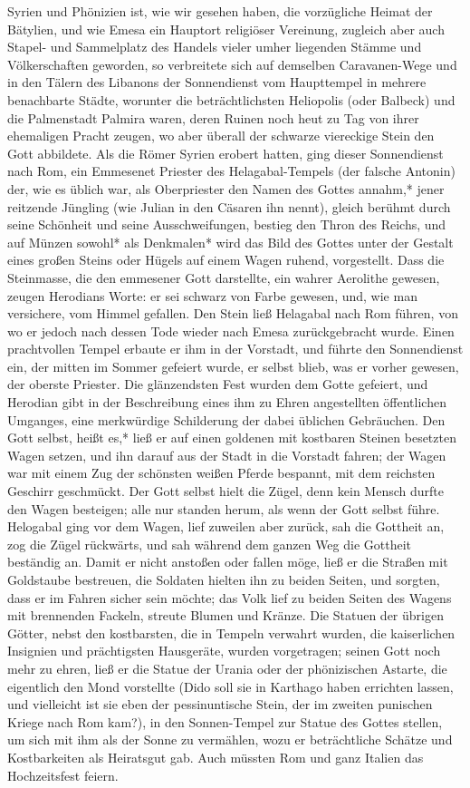 \documentclass[a4paper, 11pt, oneside, polutonikogreek, german]{article}
\begin{document}
Syrien und Phönizien ist, wie wir gesehen haben, die vorzügliche Heimat der Bätylien, und wie Emesa ein Hauptort religiöser Vereinung, zugleich aber auch Stapel- und Sammelplatz des Handels vieler umher liegenden Stämme und Völkerschaften geworden, so verbreitete sich auf demselben Caravanen-Wege und in den Tälern des Libanons der Sonnendienst vom Haupttempel in mehrere benachbarte Städte, worunter die beträchtlichsten Heliopolis (oder Balbeck) und die Palmenstadt Palmira waren, deren Ruinen noch heut zu Tag von ihrer ehemaligen Pracht zeugen, wo aber überall der schwarze viereckige Stein den Gott abbildete. Als die Römer Syrien erobert hatten, ging dieser Sonnendienst nach Rom, ein Emmesenet Priester des Helagabal-Tempels (der falsche Antonin) der, wie es üblich war, als Oberpriester den Namen des Gottes annahm,* jener reitzende Jüngling (wie Julian in den Cäsaren ihn nennt), gleich berühmt durch seine Schönheit und seine Ausschweifungen, bestieg den Thron des Reichs, und auf Münzen sowohl* als Denkmalen* wird das Bild des Gottes unter der Gestalt eines großen Steins oder Hügels auf einem Wagen ruhend, vorgestellt. Dass die Steinmasse, die den emmesener Gott darstellte, ein wahrer Aerolithe gewesen, zeugen Herodians Worte: er sei schwarz von Farbe gewesen, und, wie man versichere, vom Himmel gefallen. Den Stein ließ Helagabal nach Rom führen, von wo er jedoch nach dessen Tode wieder nach Emesa zurückgebracht wurde. Einen prachtvollen Tempel erbaute er ihm in der Vorstadt, und führte den Sonnendienst ein, der mitten im Sommer gefeiert wurde, er selbst blieb, was er vorher gewesen, der oberste Priester. Die glänzendsten Fest wurden dem Gotte gefeiert, und Herodian gibt in der Beschreibung eines ihm zu Ehren angestellten öffentlichen Umganges, eine merkwürdige Schilderung der dabei üblichen Gebräuchen. Den Gott selbst, heißt es,* ließ er auf einen goldenen mit kostbaren Steinen besetzten Wagen setzen, und ihn darauf aus der Stadt in die Vorstadt fahren; der Wagen war mit einem Zug der schönsten weißen Pferde bespannt, mit dem reichsten Geschirr geschmückt. Der Gott selbst hielt die Zügel, denn kein Mensch durfte den Wagen besteigen; alle nur standen herum, als wenn der Gott selbst führe. Helogabal ging vor dem Wagen, lief zuweilen aber zurück, sah die Gottheit an, zog die Zügel rückwärts, und sah während dem ganzen Weg die Gottheit beständig an. Damit er nicht anstoßen oder fallen möge, ließ er die Straßen mit Goldstaube bestreuen, die Soldaten hielten ihn zu beiden Seiten, und sorgten, dass er im Fahren sicher sein möchte; das Volk lief zu beiden Seiten des Wagens mit brennenden Fackeln, streute Blumen und Kränze. Die Statuen der übrigen Götter, nebst den kostbarsten, die in Tempeln verwahrt wurden, die kaiserlichen Insignien und prächtigsten Hausgeräte, wurden vorgetragen; seinen Gott noch mehr zu ehren, ließ er die Statue der Urania oder der phönizischen Astarte, die eigentlich den Mond vorstellte (Dido soll sie in Karthago haben errichten lassen, und vielleicht ist sie eben der pessinuntische Stein, der im zweiten punischen Kriege nach Rom kam?), in den Sonnen-Tempel zur Statue des Gottes stellen, um sich mit ihm als der Sonne zu vermählen, wozu er beträchtliche Schätze und Kostbarkeiten als Heiratsgut gab. Auch müssten Rom und ganz Italien das Hochzeitsfest feiern. 
\end{document}
